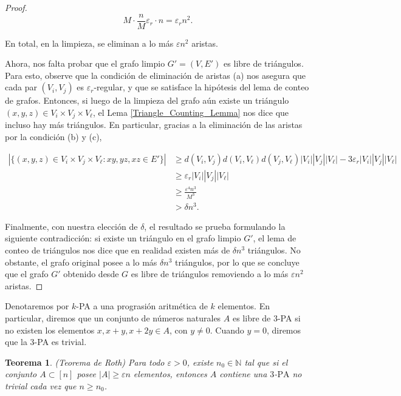 \documentclass{article}[14pts]
\newtheorem{teorema}{Teorema}
\let\varepsilon=\varepsilon
\begin{document}
\begin{proof}
    \begin{equation*}
        M\cdot \frac{n}{M}\varepsilon_r \cdot n = \varepsilon_r n^{2}.
    \end{equation*}\medskip

    En total, en la limpieza, se eliminan a lo más $\varepsilon n^{2}$ aristas.\medskip

    Ahora, nos falta probar que el grafo limpio $G' = (V, E')$ es libre de triángulos. Para esto, observe que la condición de eliminación de aristas (a) nos asegura que cada par $(V_i , V_j)$ es $\varepsilon_r$-regular, y que se satisface la hipótesis del lema de conteo de grafos. Entonces, si luego de la limpieza del grafo aún existe un triángulo $(x,y,z)\in V_i\times V_j\times V_\ell$, el Lema \ref{Triangle_Counting_Lemma} nos dice que incluso hay más triángulos. En particular, gracias a la eliminación de las aristas por la condición (b) y (c),\medskip

    \begin{align*}
        \left| \lbrace (x,y,z)\in V_i\times V_j\times V_\ell : xy,yz,xz\in E'\rbrace\right| &\geq d(V_i, V_j)d(V_i, V_\ell)d(V_j, V_\ell)|V_i||V_j||V_\ell| - 3\varepsilon_r |V_i||V_j||V_\ell|\\
        &\geq \varepsilon_r |V_i| |V_j| |V_\ell|\\
        &\geq \frac{\varepsilon^{4} n^{3}}{M^{3}}\\
        &> \delta n^{3}.
    \end{align*}\medskip

    Finalmente, con nuestra elección de $\delta$, el resultado se prueba formulando la siguiente contradicción: si existe un triángulo en el grafo limpio $G'$, el lema de conteo de triángulos nos dice que en realidad existen más de $\delta n^{3}$ triángulos. No obstante, el grafo original posee a lo más $\delta n^{3}$ triángulos, por lo que se concluye que el grafo $G'$ obtenido desde $G$ es libre de triángulos removiendo a lo más $\varepsilon n^{2}$ aristas.
\end{proof}\medskip

Denotaremos por $k$-PA a una prograsión aritmética de $k$ elementos. En particular, diremos que un conjunto de números naturales $A$ es libre de 3-PA si no existen los elementos $x,x+y,x+2y\in A$, con $y\not= 0$. Cuando $y= 0$, diremos que la 3-PA es trivial.\medskip

\begin{teorema} \label{Teorema Roth} (Teorema de Roth)
    Para todo $\varepsilon > 0$, existe $n_0\in\mathbb{N}$ tal que si el conjunto $A\subset [n]$ posee $|A|\geq \varepsilon n$ elementos, entonces $A$ contiene una $\mathrm{3}$-$\mathrm{PA}$ no trivial cada vez que $n\geq n_0$.
\end{teorema}
\end{document}
